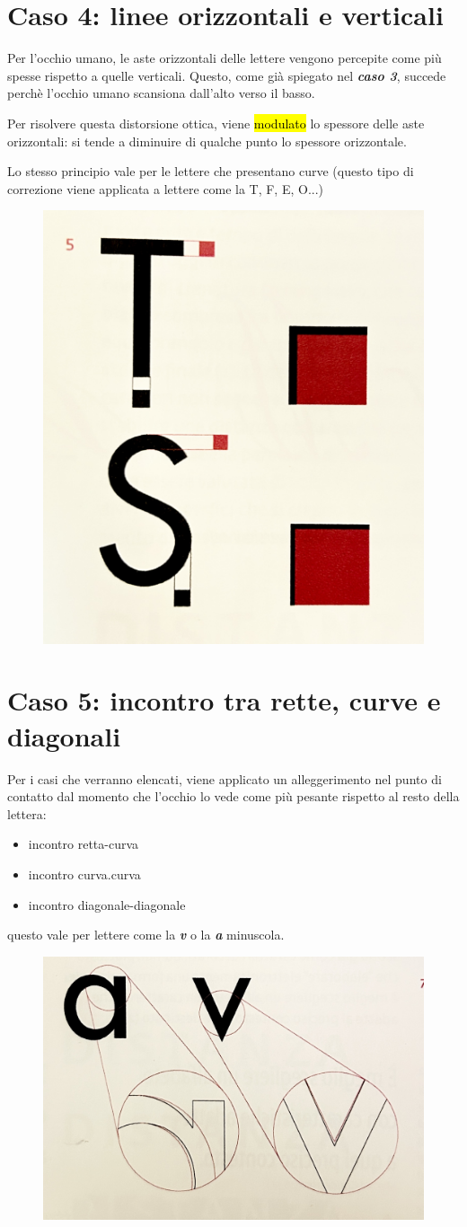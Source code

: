 \section{Caso 4: linee orizzontali e verticali}
Per l'occhio umano, le aste orizzontali delle lettere vengono percepite come più spesse rispetto a quelle verticali. Questo, come già spiegato nel \textit{\textbf{ caso 3}}, succede perchè l'occhio umano scansiona dall'alto verso il basso.

Per risolvere questa distorsione ottica, viene \hl{modulato} lo spessore delle aste orizzontali: si tende a diminuire di qualche punto lo spessore orizzontale.

Lo stesso principio vale per le lettere che presentano curve (questo tipo di correzione viene applicata a lettere come la T, F, E, O...)
\begin{figure}[H]
    \centering
    \includegraphics[width=0.3\linewidth]{lezione_2 - correzioni ottiche/imgs/IMG_4757.jpg}
\end{figure}

\section{Caso 5: incontro tra rette, curve e diagonali}
Per i casi che verranno elencati, viene applicato un alleggerimento nel punto di contatto dal momento che l'occhio lo vede come più pesante rispetto al resto della lettera:
\begin{itemize}
    \item incontro retta-curva
    \item incontro curva.curva
    \item incontro diagonale-diagonale
\end{itemize}
questo vale per lettere come la \textit{\textbf{v}} o la \textbf{\textit{a}} minuscola.
\begin{figure}[H]
    \centering
    \includegraphics[width=0.3\linewidth]{lezione_2 - correzioni ottiche/imgs/IMG_4759.jpg}
\end{figure}


